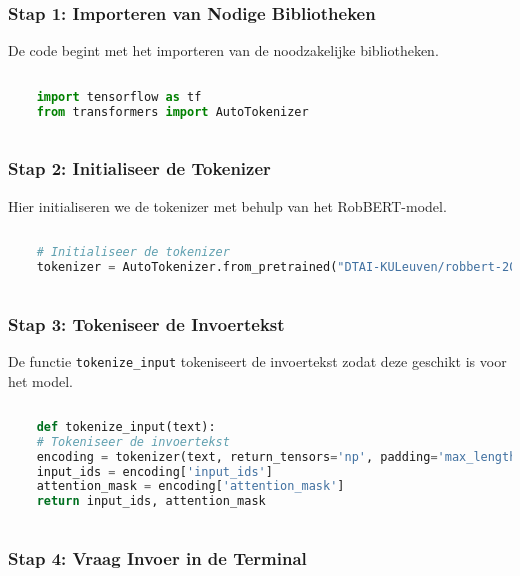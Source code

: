 \subsubsection{Stap 1: Importeren van Nodige Bibliotheken}

De code begint met het importeren van de noodzakelijke bibliotheken.

\begin{lstlisting}[language=Python, caption={Importeren van benodigde bibliotheken}]
    
    import tensorflow as tf
    from transformers import AutoTokenizer
    
\end{lstlisting}

\subsubsection{Stap 2: Initialiseer de Tokenizer}

Hier initialiseren we de tokenizer met behulp van het RobBERT-model.

\begin{lstlisting}[language=Python, caption={Initialisatie van de RobBERT tokenizer}]
    
    # Initialiseer de tokenizer
    tokenizer = AutoTokenizer.from_pretrained("DTAI-KULeuven/robbert-2023-dutch-large")
    
\end{lstlisting}

\subsubsection{Stap 3: Tokeniseer de Invoertekst}

De functie \texttt{tokenize\_input} tokeniseert de invoertekst zodat deze geschikt is voor het model.

\begin{lstlisting}[language=Python, caption={Tokeniseren van de invoertekst}]
    
    def tokenize_input(text):
    # Tokeniseer de invoertekst
    encoding = tokenizer(text, return_tensors='np', padding='max_length', truncation=True, max_length=128)
    input_ids = encoding['input_ids']
    attention_mask = encoding['attention_mask']
    return input_ids, attention_mask
    
\end{lstlisting}

\subsubsection{Stap 4: Vraag Invoer in de Terminal}

